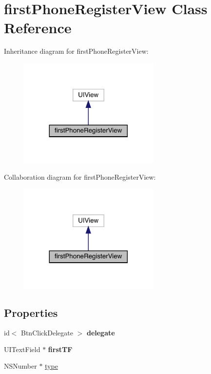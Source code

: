 \hypertarget{interfacefirst_phone_register_view}{}\section{first\+Phone\+Register\+View Class Reference}
\label{interfacefirst_phone_register_view}


Inheritance diagram for first\+Phone\+Register\+View\+:\nopagebreak
\begin{figure}[H]
\begin{center}
\leavevmode
\includegraphics[width=200pt]{interfacefirst_phone_register_view__inherit__graph}
\end{center}
\end{figure}


Collaboration diagram for first\+Phone\+Register\+View\+:\nopagebreak
\begin{figure}[H]
\begin{center}
\leavevmode
\includegraphics[width=200pt]{interfacefirst_phone_register_view__coll__graph}
\end{center}
\end{figure}
\subsection*{Properties}
\begin{DoxyCompactItemize}
\item 
\mbox{\label{interfacefirst_phone_register_view_ac2de1e66e56499f10b11fe9728c635ba}} 
id$<$ Btn\+Click\+Delegate $>$ {\bfseries delegate}
\item 
\mbox{\label{interfacefirst_phone_register_view_a4cafd517c00d599f3739b032dec11bca}} 
U\+I\+Text\+Field $\ast$ {\bfseries first\+TF}
\item 
N\+S\+Number $\ast$ \mbox{\hyperlink{interfacefirst_phone_register_view_a6d20f9336d32db450350fd1e76e39c7c}{type}}
\end{DoxyCompactItemize}



